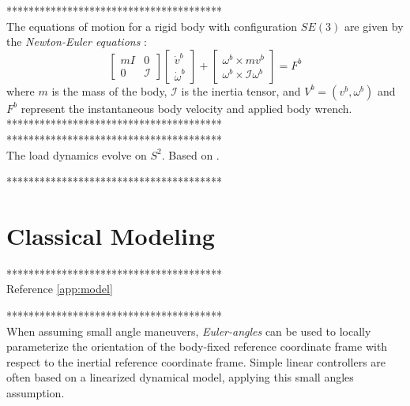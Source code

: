 ***************************************\\
The equations of motion for a rigid body with configuration $ SE(3) $ are given by the \textit{Newton-Euler equations} \cite{Murray1994}:
\begin{equation}\label{key}
\begin{bmatrix}
	mI&0\\
	0&\mathcal{I}
\end{bmatrix}
\begin{bmatrix}
	\dot{v}^b\\
	\dot{\omega}^b
\end{bmatrix}+
\begin{bmatrix}
	\omega^b\times mv^b\\
	\omega^b\times\mathcal{I}\omega^b
\end{bmatrix}=F^b
\end{equation}
where $ m $ is the mass of the body, $ \mathcal{I} $ is the inertia tensor, and $ V^b=(v^b,\omega^b) $ and $ F^b $ represent the instantaneous body velocity and applied body wrench.
***************************************\\


***************************************\\
The load dynamics evolve on $S^2 $.
Based on \cite{Lee2011}.

***************************************\\


\section{Classical Modeling}

***************************************\\
Reference \ref{app:model}

***************************************\\

When assuming small angle maneuvers, \textit{Euler-angles} can be used to locally parameterize the orientation of the body-fixed reference coordinate frame with respect to the inertial reference coordinate frame. Simple linear controllers are often based on a linearized dynamical model, applying this small angles assumption. 

